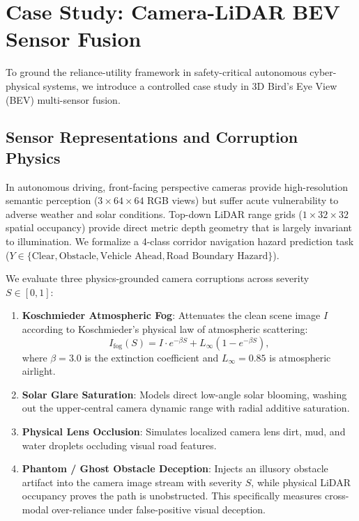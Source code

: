 \section{Case Study: Camera-LiDAR BEV Sensor Fusion}
\label{sec:bev}

To ground the reliance-utility framework in safety-critical autonomous cyber-physical systems, we introduce a controlled case study in 3D Bird's Eye View (BEV) multi-sensor fusion. 

\subsection{Sensor Representations and Corruption Physics}
In autonomous driving, front-facing perspective cameras provide high-resolution semantic perception ($3 \times 64 \times 64$ RGB views) but suffer acute vulnerability to adverse weather and solar conditions. Top-down LiDAR range grids ($1 \times 32 \times 32$ spatial occupancy) provide direct metric depth geometry that is largely invariant to illumination. We formalize a 4-class corridor navigation hazard prediction task ($Y \in \{\text{Clear}, \text{Obstacle}, \text{Vehicle Ahead}, \text{Road Boundary Hazard}\}$).

We evaluate three physics-grounded camera corruptions across severity $S \in [0, 1]$:
\begin{enumerate}
    \item \textbf{Koschmieder Atmospheric Fog}: Attenuates the clean scene image $I$ according to Koschmieder's physical law of atmospheric scattering:
    \begin{equation}
        I_{\text{fog}}(S) = I \cdot e^{-\beta S} + L_{\infty} (1 - e^{-\beta S}),
    \end{equation}
    where $\beta=3.0$ is the extinction coefficient and $L_{\infty}=0.85$ is atmospheric airlight.
    \item \textbf{Solar Glare Saturation}: Models direct low-angle solar blooming, washing out the upper-central camera dynamic range with radial additive saturation.
    \item \textbf{Physical Lens Occlusion}: Simulates localized camera lens dirt, mud, and water droplets occluding visual road features.
    \item \textbf{Phantom / Ghost Obstacle Deception}: Injects an illusory obstacle artifact into the camera image stream with severity $S$, while physical LiDAR occupancy proves the path is unobstructed. This specifically measures cross-modal over-reliance under false-positive visual deception.
\end{enumerate}

